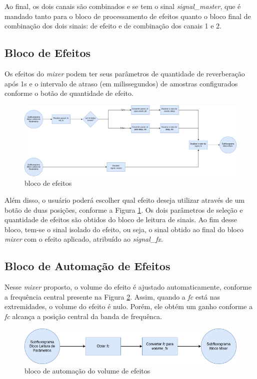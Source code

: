 Ao final, os dois canais são combinados e se tem o sinal \textit{signal\_master}, que é mandado tanto para o bloco de processamento de efeitos quanto o bloco final de combinação dos dois sinais: de efeito e de combinação dos canais 1 e 2.

\subsection{Bloco de Efeitos}

Os efeitos do \textit{mixer} podem ter seus parâmetros de quantidade de reverberação após 1s e o intervalo de atraso (em milissegundos) de amostras configurados conforme o botão de quantidade de efeito. 

\begin{figure}[h]
    \centering
    \includegraphics[width=\textwidth]{figuras/fig56.png}
    \caption{bloco de efeitos}
    \label{fig56}
\end{figure}

Além disso, o usuário poderá escolher qual efeito deseja utilizar através de um botão de duas posições, conforme a Figura \ref{fig56}. Os dois parâmetros de seleção e quantidade de efeitos são obtidos do bloco de leitura de sinais. Ao fim desse bloco, tem-se o sinal isolado do efeito, ou seja, o sinal obtido ao final do bloco \textit{mixer} com o efeito aplicado, atribuído ao \textit{signal\_fx}. 

\subsection{Bloco de Automação de Efeitos}

Nesse \textit{mixer} proposto, o volume do efeito é ajustado automaticamente, conforme a frequência central presente na Figura \ref{fig57}. Assim, quando a \textit{fc} está nas extremidades, o volume do efeito é nulo. Porém, ele obtém um ganho conforme a \textit{fc} alcança a posição central da banda de frequênca.

\begin{figure}[h]
    \centering
    \includegraphics[width=\textwidth]{figuras/fig57.png}
    \caption{bloco de automação do volume de efeitos}
    \label{fig57}
\end{figure}

